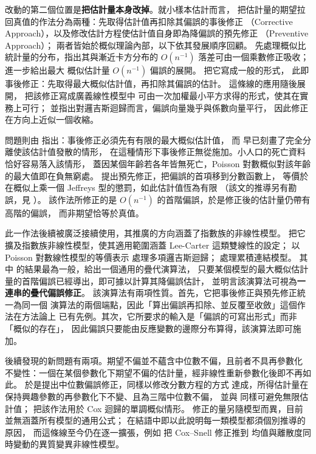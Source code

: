 \documentclass[UTF8, fontset=macnew, a4paper, 12pt]{ctexart}
\begin{document}
改動的第二個位置是\textbf{把估計量本身改掉}。就小樣本估計而言，
把估計量的期望拉回真值的作法分為兩種：先取得估計值再扣除其偏誤的事後修正
（Corrective Approach），以及修改估計方程使估計值自身即為降偏誤的預先修正
（Preventive Approach）；
兩者皆始於概似理論內部，以下依其發展順序回顧。
\citet{bartlett1937} 先處理概似比統計量的分布，指出其與漸近卡方分布的
$O(n^{-1})$ 落差可由一個乘數修正吸收；\citet{bartlett1953} 進一步給出最大
概似估計量 $O(n^{-1})$ 偏誤的展開。\citet{coxsnell1968} 把它寫成一般的形式，
此即事後修正：先取得最大概似估計值，再扣除其偏誤的估計。
這條線的應用隨後展開，\citet{cordeiro1991} 把該修正寫成廣義線性模型中
可由一次加權最小平方求得的形式，使其在實務上可行；
並指出對邏吉斯迴歸而言，偏誤向量幾乎與係數向量平行，
因此修正在方向上近似一個收縮。

問題則由 \citet{firth1993} 指出：事後修正必須先有有限的最大概似估計值，
而 \citet{albert1984} 早已刻畫了完全分離使該估計值發散的情形，
在這種情形下事後修正無從施加。小人口的死亡資料恰好容易落入該情形，
蓋因某個年齡若各年皆無死亡，Poisson 對數概似對該年齡的最大值即在負無窮處。
\citet{firth1993} 提出預先修正，把偏誤的首項移到分數函數上，
等價於在概似上乘一個 Jeffreys 型的懲罰，如此估計值恆為有限
（該文的推導另有勘誤，見 \citealp{firth1995}）。
該作法所修正的是 $O(n^{-1})$ 的首階偏誤，於是修正後的估計量仍帶有高階的偏誤，
而非期望恰等於真值。

此一作法後續被廣泛接續使用，其推廣的方向涵蓋了指數族的非線性模型。
\citet{kosmidis2009} 把它擴及指數族非線性模型，使其適用範圍涵蓋 Lee-Carter
這類雙線性的設定；\citet{kosmidis2011} 以 Poisson 對數線性模型的等價表示
處理多項邏吉斯迴歸；\citet{kosmidis2014} 處理累積連結模型。
其中 \citet{kosmidis2010} 的結果最為一般，給出一個通用的疊代演算法，
只要某個模型的最大概似估計量的首階偏誤已經導出，即可據以計算其降偏誤估計，
並明言該演算法可視為\textbf{一連串的疊代偏誤修正}。
該演算法有兩項性質。首先，它把事後修正與預先修正統一為同一個
演算法的兩個端點，因此「算出偏誤再扣除、並反覆至收斂」這個作法在方法論上
已有先例。其次，它所要求的輸入是「偏誤的可寫出形式」而非「概似的存在」，
因此偏誤只要能由反應變數的邊際分布算得，該演算法即可施加。

後續發現的新問題有兩項。期望不偏並不蘊含中位數不偏，且前者不具再參數化
不變性：一個在某個參數化下期望不偏的估計量，經非線性重新參數化後即不再如此。
\citet{kennepagui2017} 於是提出中位數偏誤修正，同樣以修改分數方程的方式
達成，所得估計量在保持興趣參數的再參數化下不變、且為三階中位數不偏，
並與 \citet{firth1993} 同樣可避免無限估計值；
\citet{kennepagui2020} 把該作法用於 Cox 迴歸的單調概似情形。
修正的量另隨模型而異，目前並無涵蓋所有模型的通用公式；
\citet{cordeiro1991} 在結語中即以此說明每一類模型都須個別推導的原因，
而這條線至今仍在逐一擴張，例如 \citet{sossa2026} 把 Cox--Snell 修正推到
均值與離散度同時變動的異質變異非線性模型。
\end{document}
